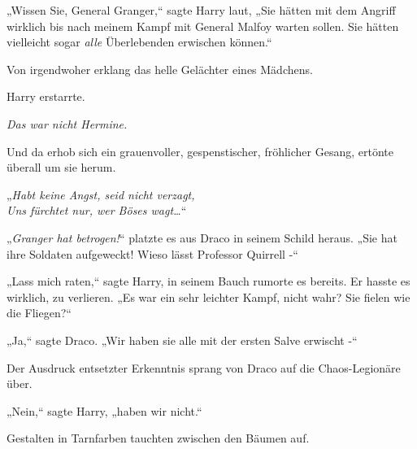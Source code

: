 „Wissen Sie, General Granger,“ sagte Harry laut, „Sie hätten mit dem Angriff wirklich bis nach meinem Kampf mit General Malfoy warten sollen. Sie hätten vielleicht sogar \emph{alle} Überlebenden erwischen können.“

Von irgendwoher erklang das helle Gelächter eines Mädchens.

Harry erstarrte.

\emph{Das war nicht Hermine.}

Und da erhob sich ein grauenvoller, gespenstischer, fröhlicher Gesang, ertönte überall um sie herum.

„\emph{Habt keine Angst, seid nicht verzagt,\\ Uns fürchtet nur, wer Böses wagt…}“

„\emph{Granger hat betrogen!}“ platzte es aus Draco in seinem Schild heraus. „Sie hat ihre Soldaten aufgeweckt! Wieso lässt Professor Quirrell -“

„Lass mich raten,“ sagte Harry, in seinem Bauch rumorte es bereits. Er hasste es wirklich, zu verlieren. „Es war ein sehr leichter Kampf, nicht wahr? Sie fielen wie die Fliegen?“

„Ja,“ sagte Draco. „Wir haben sie alle mit der ersten Salve erwischt -“

Der Ausdruck entsetzter Erkenntnis sprang von Draco auf die Chaos-Legionäre über.

„Nein,“ sagte Harry, „haben wir nicht.“

Gestalten in Tarnfarben tauchten zwischen den Bäumen auf.

